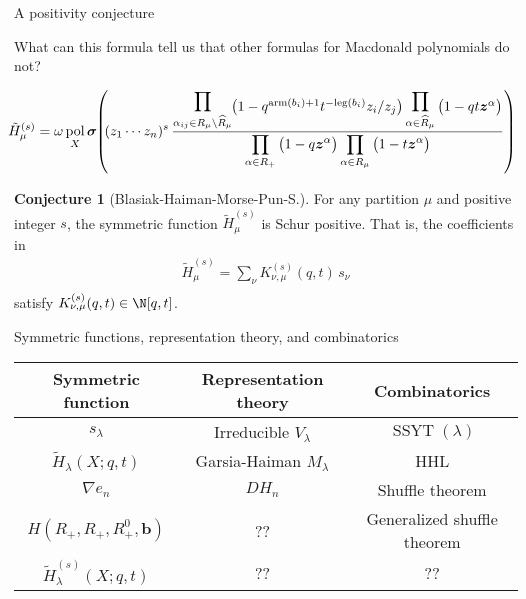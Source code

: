 \documentclass[dvipsnames]{beamer}
\newcommand{\zz}{{\boldsymbol z}}
\newcommand{\sigmabold}{\boldsymbol \sigma}
\newcommand{\Htild}{\tilde{H}}
\DeclareMathOperator{\pol}{pol}
\DeclareMathOperator{\SSYT}{SSYT}
\newcommand{\leg}{{\mathrm{leg}}}
\newcommand{\arm}{{\mathrm{arm}}}
\newcommand{\bbb}{{s}}
\newcommand{\bb}{{\mathbf b}}
\theoremstyle{definition}
\newtheorem{conjecture}[theorem]{Conjecture}
\newcounter{c}
\begin{document}
\begin{frame}{A positivity conjecture}
  \begin{center}
What can this formula tell us that other formulas for Macdonald polynomials do not?
\end{center}
\pause


\vspace{-3mm}
\vspace{-1mm}
{\small \begin{align*}
  \hspace{-0.5em}\Htild^{(s)}_{\mu} = \omega \pol_X \sigmabold \hspace{-0.25em}
  \left( \hspace{-0.25em} (z_1\cdots z_n)^s \,
\frac{
 \displaystyle\prod_{\alpha_{ij} \in R_\mu \setminus \widehat{R}_\mu }
 \hspace{-0.25em}\raisebox{-1.4mm}{$\big(1- q^{\arm(b_i)+1} t^{-\leg(b_i)} z_i/z_j \big)$}
\displaystyle\prod_{\alpha \in \widehat{R}_{\mu}}
 \raisebox{-1.4mm}{$\big(1-q  t \zz^\alpha \big)$} } {\displaystyle \prod_{\alpha \in R_+} \big(1-q  \zz^\alpha\big)
\prod_{\alpha \in R_\mu} \big(1-t  \zz^\alpha\big)}\right)
\end{align*}}


\vspace{-1.4mm}
\begin{conjecture}[Blasiak-Haiman-Morse-Pun-S.]
For any partition  $\mu$ and positive integer $s$, the symmetric function
 $\Htild^{(s)}_{\mu}$ is Schur positive.
That is, the coefficients in
\vspace{-1mm}
\begin{align*}
\Htild^{(s)}_{\mu}
= \sum_{\nu } K^{(s)} _{\nu , \mu}(q,t)\, s_\nu  \\[-10mm]
\end{align*}
satisfy $K^{(\bbb)}_{\nu , \mu}(q,t)\in \N[q,t]$.
\end{conjecture}
\end{frame}
\begin{frame}{Symmetric functions, representation theory, and combinatorics}
  \begin{tabular}{ccc}
      Symmetric function & Representation theory & Combinatorics 
      \\
      \hline
      \(s_\lambda\) & Irreducible \(V_\lambda\) & \(\SSYT(\lambda)\) \\
      \(\Htild_\lambda(X;q,t)\) & Garsia-Haiman \(M_\lambda\) & HHL\\
      \(\nabla e_n\) & \(DH_n\) & Shuffle theorem \\
      \(H(R_+,R_+,R_+^0,\bb)\) & ?? & Generalized shuffle theorem \\
      \(\Htild^{(s)}_\lambda(X;q,t)\) & ?? & ??
    \end{tabular}
\end{frame}
\end{document}
